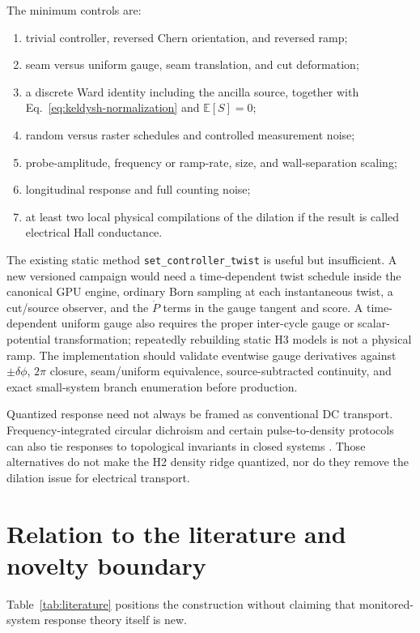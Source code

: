 \documentclass[aps,prb,onecolumn,nofootinbib,superscriptaddress]{revtex4-2}
\newcommand{\E}{\mathbb{E}}
\newcommand{\code}[1]{\texttt{#1}}
\begin{document}
The minimum controls are:
\begin{enumerate}
  \item trivial controller, reversed Chern orientation, and reversed ramp;
  \item seam versus uniform gauge, seam translation, and cut deformation;
  \item a discrete Ward identity including the ancilla source, together with
  Eq.~\eqref{eq:keldysh-normalization} and $\E[S]=0$;
  \item random versus raster schedules and controlled measurement noise;
  \item probe-amplitude, frequency or ramp-rate, size, and wall-separation
  scaling;
  \item longitudinal response and full counting noise;
  \item at least two local physical compilations of the dilation if the result
  is called electrical Hall conductance.
\end{enumerate}

The existing static method \code{set\_controller\_twist} is useful but
insufficient.  A new versioned campaign would need a time-dependent twist
schedule inside the canonical GPU engine, ordinary Born sampling at each
instantaneous twist, a cut/source observer, and the $\dot P$ terms in the gauge
tangent and score.  A time-dependent uniform gauge also requires the proper
inter-cycle gauge or scalar-potential transformation; repeatedly rebuilding
static H3 models is not a physical ramp.  The implementation should validate
eventwise gauge derivatives against $\pm\delta\phi$, $2\pi$ closure,
seam/uniform equivalence, source-subtracted continuity, and exact small-system
branch enumeration before production.

Quantized response need not always be framed as conventional DC transport.
Frequency-integrated circular dichroism and certain pulse-to-density protocols
can also tie responses to topological invariants in closed systems
\cite{RepellinGoldman2019,Zhang2023}.  Those alternatives do not make the H2
density ridge quantized, nor do they remove the dilation issue for electrical
transport.

\section{Relation to the literature and novelty boundary}
\label{sec:literature}

Table~\ref{tab:literature} positions the construction without claiming that
monitored-system response theory itself is new.
\end{document}

